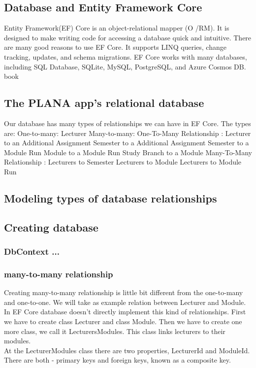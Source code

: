 \documentclass{scrartcl}
\begin{document}
\subsection{Database and Entity Framework Core}
Entity Framework(EF) Core is an object-relational mapper (O /RM). It is designed to make writing code for accessing a database quick and intuitive.
There are many good reasons to use EF Core. It supports LINQ queries, change tracking, updates, and schema migrations. EF Core works with many databases, including SQL Database, SQLite, MySQL, PostgreSQL, and Azure Cosmos DB.
book \cite{efa} \cite{ef}

\subsection{The PLANA app's relational database}
Our database has many types of relationships we can have in EF Core. The types are:
One-to-many: Lecturer
Many-to-many:
One-To-Many Relationship : 
Lecturer to an Additional Assignment 
Semester to a Additional Assignment
Semester to a Module Run 
Module to a Module Run
Study Branch to a Module
Many-To-Many Relationship :
Lecturers to Semester
Lecturers to Module
Lecturers to Module Run




\subsection{Modeling types of database relationships}

\subsection{Creating database}

\subsubsection{DbContext ...}

\subsubsection{many-to-many relationship }
Creating many-to-many relationship is little bit different from the one-to-many and one-to-one.
We will take as example relation between Lecturer and Module.\\

In EF Core database doesn't directly implement this kind of relationships.
First we have to create class Lecturer and class Module. Then we have to create one more class, we call it LecturersModules. This class links lecturers to their modules. \\
At the LecturerModules class there are two properties, LecturerId and ModuleId. There are both - primary keys and foreign keys, known as a composite key.\cite{efa}
\end{document}
